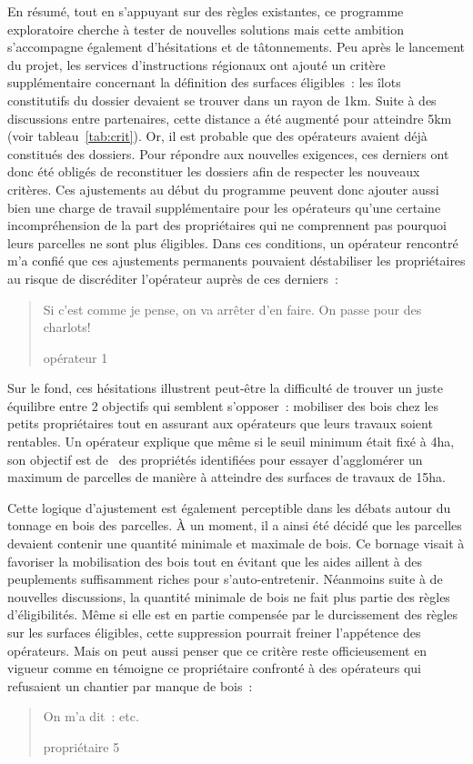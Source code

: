 \documentclass[12pt]{report}
\newcounter{table1}
\begin{document}
En résumé, tout en s'appuyant sur des règles existantes, ce programme
exploratoire cherche à tester de nouvelles solutions mais cette ambition
s’accompagne également d’hésitations et de tâtonnements. Peu après le lancement
du projet, les services d'instructions régionaux ont ajouté un critère
supplémentaire concernant la définition des surfaces éligibles~: les îlots
constitutifs du dossier devaient se trouver dans un rayon de 1km. Suite à des
discussions entre partenaires, cette distance a été augmenté pour atteindre 5km
(voir tableau~\ref{tab:crit}). Or, il est probable que des opérateurs avaient
déjà constitués des dossiers. Pour répondre aux nouvelles exigences, ces derniers
ont donc été obligés de reconstituer les dossiers afin de respecter les nouveaux
critères. Ces ajustements au début du programme peuvent donc ajouter aussi bien
une charge de travail supplémentaire pour les opérateurs qu'une certaine
incompréhension de la part des propriétaires qui ne comprennent pas pourquoi
leurs parcelles ne sont plus éligibles. Dans ces conditions, un opérateur
rencontré m'a confié que ces ajustements permanents pouvaient déstabiliser les
propriétaires au risque de discréditer l'opérateur auprès de ces derniers~: \blockquote[opérateur 1]
{Si c'est comme je pense, on va arrêter d'en faire. On passe pour des charlots!}.
Sur le fond, ces hésitations illustrent peut-être la difficulté de trouver un
juste équilibre entre 2 objectifs qui semblent s'opposer~: mobiliser des bois
chez les petits propriétaires tout en assurant aux opérateurs que leurs travaux
soient rentables. Un opérateur explique que même si le seuil minimum était fixé
à 4ha, son objectif est de~ des propriétés identifiées
pour essayer d'agglomérer un maximum de parcelles de manière à atteindre des
surfaces de travaux de 15ha.

Cette logique d’ajustement est également perceptible dans les débats autour du
tonnage en bois des parcelles. À un moment, il a ainsi été décidé que les
parcelles devaient contenir une quantité minimale et maximale de bois. Ce bornage
visait à favoriser la mobilisation des bois tout en évitant que les aides aillent
à des peuplements suffisamment riches pour s’auto-entretenir. Néanmoins suite à
de nouvelles discussions, la quantité minimale de bois ne fait plus partie des
règles d’éligibilités. Même si elle est en partie compensée par le durcissement
des règles sur les surfaces éligibles, cette suppression pourrait freiner
l’appétence des opérateurs. Mais on peut aussi penser que ce critère reste
officieusement en vigueur comme en témoigne ce propriétaire confronté à des
opérateurs qui refusaient un chantier par manque de bois~: \blockquote[propriétaire 5]
{On m'a dit~: etc.}
\end{document}
